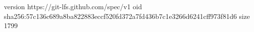 version https://git-lfs.github.com/spec/v1
oid sha256:57c136c689a8ba822883eccf520fd372a7fd436b7c1e3266d6241cff973f81d6
size 1799
